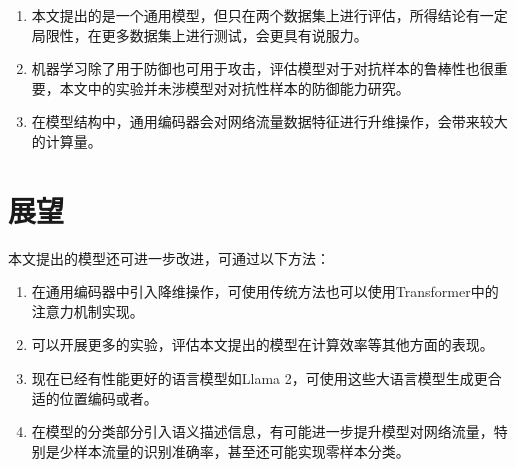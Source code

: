 \begin{enumerate}

    \item 本文提出的是一个通用模型，但只在两个数据集上进行评估，所得结论有一定局限性，在更多数据集上进行测试，会更具有说服力。
    \item 机器学习除了用于防御也可用于攻击，评估模型对于对抗样本的鲁棒性也很重要，本文中的实验并未涉模型对对抗性样本的防御能力研究。
    \item  在模型结构中，通用编码器会对网络流量数据特征进行升维操作，会带来较大的计算量。
\end{enumerate}

\section{展望}
本文提出的模型还可进一步改进，可通过以下方法：
\begin{enumerate}
    \item 在通用编码器中引入降维操作，可使用传统方法也可以使用Transformer中的注意力机制实现。
    \item 可以开展更多的实验，评估本文提出的模型在计算效率等其他方面的表现。
    \item 现在已经有性能更好的语言模型如Llama 2，可使用这些大语言模型生成更合适的位置编码或者。
    \item 在模型的分类部分引入语义描述信息，有可能进一步提升模型对网络流量，特别是少样本流量的识别准确率，甚至还可能实现零样本分类。

\end{enumerate}



\label{sec:futurework}

